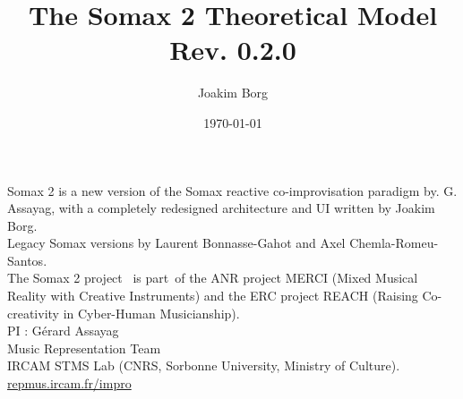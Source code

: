 \documentclass[10pt]{report}
\title{The Somax 2 Theoretical Model\\[0.24cm]
	\large{Rev. 0.2.0}}
\author{Joakim Borg}
\date{\today}
\begin{document}
\maketitle
\chapter*{}
\small{
Somax 2 is a new version of the Somax reactive co-improvisation paradigm by. G. Assayag, with a completely redesigned architecture and UI written by Joakim Borg.
\\

\noindent Legacy Somax versions by Laurent Bonnasse-Gahot and Axel Chemla-Romeu-Santos.
\\

\noindent The Somax 2 project  is part of the ANR project MERCI (Mixed Musical Reality with Creative Instruments) and the ERC project REACH (Raising Co-creativity in Cyber-Human Musicianship).
\\

\noindent PI : Gérard Assayag\\
Music Representation Team\\
IRCAM STMS Lab (CNRS, Sorbonne University, Ministry of Culture).
\\

\noindent\url{repmus.ircam.fr/impro}
}

\tableofcontents









{}

\end{document}
